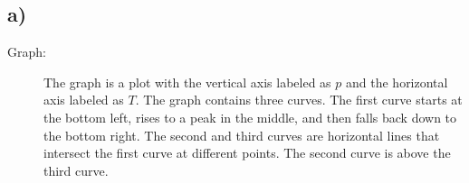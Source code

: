

\subsection*{a)}

\begin{description}
    \item[Graph:] The graph is a plot with the vertical axis labeled as $p$ and the horizontal axis labeled as $T$. The graph contains three curves. The first curve starts at the bottom left, rises to a peak in the middle, and then falls back down to the bottom right. The second and third curves are horizontal lines that intersect the first curve at different points. The second curve is above the third curve.
\end{description}